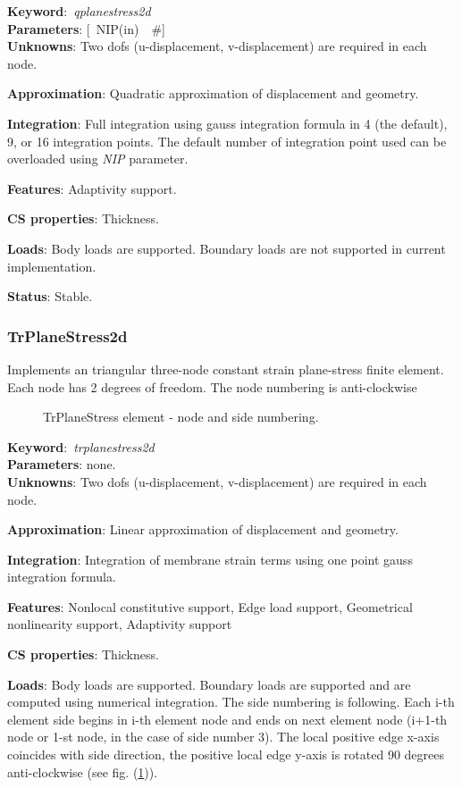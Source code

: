 \documentclass[12pt,dvips]{article}
\newcommand{\descitem}[1]{{\noindent \bf #1}:}
\newcommand{\elemkeyword}[1]{\descitem{Keyword}~{\em #1}}
\newcommand{\elemparam}[2]{{{#1\tiny (#2)}~~\#}}
\newcommand{\optelemparam}[2]{{[~\elemparam{#1}{#2}]}}
\newcommand{\param}[1]{{\it #1}}
\begin{document}
\elemkeyword{qplanestress2d}\\
\descitem{Parameters} \optelemparam{NIP}{in}\\
\descitem{Unknowns}
Two dofs (u-displacement, v-displacement) are required in each node.

\descitem{Approximation} Quadratic approximation of displacement and
geometry.

\descitem{Integration}
Full integration using gauss integration formula
in 4 (the default), 9, or 16 integration points. The default number of
integration point used can be overloaded using \param{NIP} parameter.

\descitem{Features} Adaptivity support.

\descitem{CS properties} Thickness. 

\descitem{Loads} Body loads are supported. Boundary loads are
not supported in current implementation.

\descitem{Status} Stable.

\subsubsection{TrPlaneStress2d}
Implements an triangular three-node  constant strain plane-stress  
finite element. Each node has 2 degrees of freedom.
The node numbering is anti-clockwise

\begin{figure}[htb]
\begin{center}\end{center}
\caption{TrPlaneStress element - node and side numbering.}
\label{TrPlanestressfig}
\end{figure}

\elemkeyword{trplanestress2d}\\
\descitem{Parameters} none.\\
\descitem{Unknowns}
Two dofs (u-displacement, v-displacement) are required in each node.

\descitem{Approximation} Linear approximation of displacement and
geometry.

\descitem{Integration}
Integration of membrane strain terms using one point gauss integration formula.

\descitem{Features} Nonlocal constitutive support, Edge load
support, Geometrical nonlinearity support, Adaptivity support

\descitem{CS properties} Thickness. 

\descitem{Loads} Body loads are supported. Boundary loads are
supported and are computed  using numerical integration. The side numbering is
following. Each i-th element side begins in i-th element node and
ends on next element node (i+1-th node or 1-st node, in the case of 
side number 3). The local positive edge x-axis coincides with side
direction, the positive local edge y-axis is rotated 90 degrees
anti-clockwise (see fig. (\ref{TrPlanestressfig})).
\end{document}
